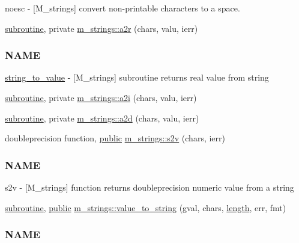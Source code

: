 \begin{DoxyCompactItemize}
\begin{DoxyCompactList}
noesc -\/ \mbox{[}M\+\_\+strings\mbox{]} convert non-\/printable characters to a space. \end{DoxyCompactList}\item 
\hyperlink{M__stopwatch_83_8txt_acfbcff50169d691ff02d4a123ed70482}{subroutine}, private \hyperlink{namespacem__strings_a6b4babf586dc3586426b13e4bb0fb979}{m\+\_\+strings\+::a2r} (chars, valu, ierr)
\begin{DoxyCompactList}\small\item\em \subsubsection*{N\+A\+ME}

\hyperlink{interfacem__strings_1_1string__to__value}{string\+\_\+to\+\_\+value} -\/ \mbox{[}M\+\_\+strings\mbox{]} subroutine returns real value from string \end{DoxyCompactList}\item 
\hyperlink{M__stopwatch_83_8txt_acfbcff50169d691ff02d4a123ed70482}{subroutine}, private \hyperlink{namespacem__strings_aca902af295ede82fb0c45174bbfe6eef}{m\+\_\+strings\+::a2i} (chars, valu, ierr)
\item 
\hyperlink{M__stopwatch_83_8txt_acfbcff50169d691ff02d4a123ed70482}{subroutine}, private \hyperlink{namespacem__strings_a751d3101d8404ea10db4d8ba59a75d6b}{m\+\_\+strings\+::a2d} (chars, valu, ierr)
\item 
doubleprecision function, \hyperlink{M__stopwatch_83_8txt_a2f74811300c361e53b430611a7d1769f}{public} \hyperlink{namespacem__strings_a7b153720f1f9b93c49094dcb1272995b}{m\+\_\+strings\+::s2v} (chars, ierr)
\begin{DoxyCompactList}\small\item\em \subsubsection*{N\+A\+ME}

s2v -\/ \mbox{[}M\+\_\+strings\mbox{]} function returns doubleprecision numeric value from a string \end{DoxyCompactList}\item 
\hyperlink{M__stopwatch_83_8txt_acfbcff50169d691ff02d4a123ed70482}{subroutine}, \hyperlink{M__stopwatch_83_8txt_a2f74811300c361e53b430611a7d1769f}{public} \hyperlink{namespacem__strings_a58d30b135c367184a666f8b4baaa64b5}{m\+\_\+strings\+::value\+\_\+to\+\_\+string} (gval, chars, \hyperlink{M__stopwatch_83_8txt_a04ed5ef37abacfa36a856b5f30376485}{length}, err, fmt)
\begin{DoxyCompactList}\small\item\em \subsubsection*{N\+A\+ME}


\end{DoxyCompactList}
\end{DoxyCompactItemize}
